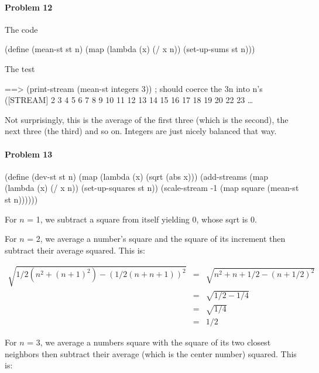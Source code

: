 \paragraph{Problem 12}

The code

\beginlisp
(define (mean-st st n)
  (map (lambda (x) (/ x n))
       (set-up-sums st n)))
\endlisp

The test

\beginlisp
==> (print-stream (mean-st integers 3))  ; should coerce the 3n into n's
([STREAM] 2 3 4 5 6 7 8 9 10 11 12 13 14 15 16 17 18 19 20 22 23 \ldots
\endlisp

Not surprisingly, this is the average of the first three (which is the second),
the next three (the third) and so on. Integers are just nicely balanced that
way.

\newpage

\paragraph{Problem 13}

\mbox{} %

\beginlisp
(define (dev-st st n)
  (map (lambda (x) (sqrt (abs x)))
       (add-streams (map (lambda (x) (/ x n))
                         (set-up-squares st n))
                    (scale-stream -1 (map square (mean-st st n))))))
\endlisp

For $n$ = 1, we subtract a square from itself yielding 0, whose sqrt is 0.

For $n$ = 2, we average a number's square and the square of its increment then
subtract their average squared. This is:

\begin{eqnarray*}
\sqrt{1/2(n^2 + (n+1)^2) - (1/2(n+n+1))^2} &=& \sqrt{n^2+n+1/2 - (n+1/2)^2} \\
                                           &=& \sqrt{1/2 - 1/4}             \\
                                           &=& \sqrt{1/4}                   \\
                                           &=& 1/2
\end{eqnarray*}

For $n$ = 3, we average a numbers square with the square of its two closest neighbors
then subtract their average (which is the center number) squared. This is:

